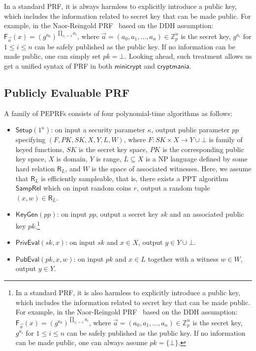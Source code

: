 \documentclass[a4paper,10pt]{article}
\begin{document}
\begin{remark}
In a standard PRF, it is always harmless to explicitly introduce a public key, 
which includes the information related to secret key that can be made public. 
For example, in the Naor-Reingold PRF~\cite{NR-JACM-2004} based on the DDH assumption: 
$\mathsf{F}_{\vec{a}}(x) = (g^{a_0})^{\prod_{x_i=1}a_i}$, 
where $\vec{a} = (a_0, a_1, \dots, a_n) \in \mathbb{Z}_p^n$ is the secret key, 
$g^{a_i}$ for $1 \leq i \leq n$ can be safely published as the public key.  
If no information can be made public, one can simply set $pk = \bot$. 
Looking ahead, such treatment allows us get a unified syntax of PRF 
in both $\mathsf{minicrypt}$ and $\mathsf{cryptmania}$.     
\end{remark}

\subsection{Publicly Evaluable PRF}
\begin{definition}\label{def:PEPRF}
A family of PEPRFs consists of four polynomial-time algorithms as follows:
\begin{itemize} 
    \item $\mathsf{Setup}(1^\kappa)$: on input a security parameter $\kappa$, 
        output public parameter $pp$ specifying $(F, PK, SK, X, \allowbreak Y, L, W)$, 
        where $F: SK \times X \rightarrow Y \cup \bot$ is family of keyed functions, 
        $SK$ is the secret key space, $PK$ is the corresponding public key space, 
        $X$ is domain, $Y$ is range, 
        $L \subseteq X$ is a NP language defined by some hard relation $\mathsf{R}_L$, 
        and $W$ is the space of associated witnesses. 
        Here, we assume that $\mathsf{R}_L$ is efficiently sampleable, 
        that is, there exists a PPT algorithm $\mathsf{SampRel}$ 
        which on input random coins $r$, output a random tuple $(x, w) \in \mathsf{R}_L$.   

    \item $\mathsf{KeyGen}(pp)$: on input $pp$, output a secret key $sk$ and 
        an associated public key $pk$.\footnote{In a standard PRF, 
        it is also harmless to explicitly introduce a public key, 
        which includes the information related to secret key that can be made public. 
        For example, in the Naor-Reingold PRF~\cite{NR-JACM-2004} based on the DDH assumption: 
        $\mathsf{F}_{\vec{a}}(x) = (g^{a_0})^{\prod_{x_i=1}a_i}$, where
        $\vec{a} = (a_0, a_1, \dots, a_n) \in \mathbb{Z}_p^n$ is the secret key, 
        $g^{a_i}$ for $1 \leq i \leq n$ can be safely published as the public key.  
        If no information can be made public, one can always assume $pk = \{\bot\}$.}     
    
    \item $\mathsf{PrivEval}(sk, x)$: on input $sk$ and $x \in X$, 
        output $y \in Y \cup \bot$.  

    \item $\mathsf{PubEval}(pk, x, w)$: on input $pk$ and $x \in L$ together with a witness $w \in W$, 
        output $y \in Y$.  
\end{itemize}
\end{definition}
\end{document}
